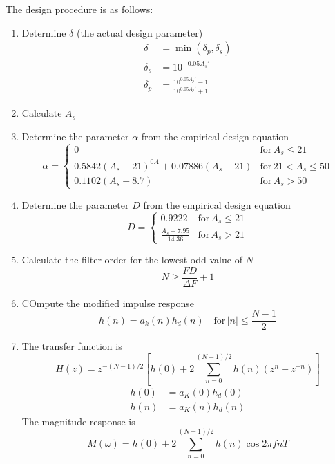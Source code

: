 \documentclass[11pt]{book}
\theoremstyle{example}
\begin{document}
The design procedure is as follows:
\begin{enumerate}
	\item Determine $\delta$ (the actual design parameter)
		\begin{align}
			\delta&=\min(\delta_p,\delta_s)\\
			\delta_s&=10^{-0.05A_s'}\\
			\delta_p&=\frac{10^{0.05A_p'}-1}{10^{0.05A_p'}+1}
		\end{align}
	\item Calculate $A_s$
	\item Determine the parameter $\alpha$ from the empirical design equation
		\begin{equation}
			\alpha=
			\begin{cases}
				0 & \mathrm{for}\,A_s{\leq}21\\
				0.5842(A_s-21)^{0.4}+0.07886(A_s-21) & \mathrm{for}\,21<A_s{\leq}50\\
				0.1102(A_s-8.7) & \mathrm{for}\,A_s>50
			\end{cases}
		\end{equation}
	\item Determine the parameter $D$ from the empirical design equation
		\begin{equation}
			D=
			\begin{cases}
				0.9222 & \mathrm{for}\,A_s{\leq}21\\
				\frac{A_s-7.95}{14.36} & \mathrm{for}\,A_s>21
			\end{cases}
		\end{equation}
	\item Calculate the filter order for the lowest odd value of $N$
		\begin{equation}
			N\geq\frac{FD}{{\Delta}F}+1
		\end{equation}
	\item COmpute the modified impulse response
		\begin{equation}
			h(n)=a_k(n)h_d(n)\quad\mathrm{for}\,|n|\leq\frac{N-1}{2}
		\end{equation}
	\item The transfer function is
		\begin{equation}
			H(z)=z^{-(N-1)/2}\left[h(0)+2\sum_{n=0}^{(N-1)/2}{h(n)(z^n+z^{-n})}\right]
		\end{equation}
		\begin{align}
			h(0)&=a_K(0)h_d(0)\\
			h(n)&=a_K(n)h_d(n)
		\end{align}
		The magnitude response is
		\begin{equation}
			M(\omega)=h(0)+2\sum_{n=0}^{(N-1)/2}{h(n)\cos{2{\pi}fnT}}
		\end{equation}
\end{enumerate}
\end{document}
